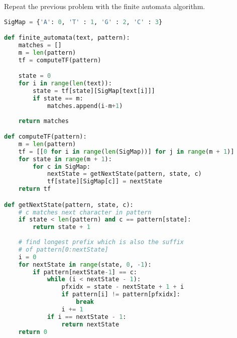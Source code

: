 \documentclass[12pt]{article}
\newenvironment{problem}[2][Problem]{\begin{trivlist}
\item[\hskip \labelsep {\bfseries #1}\hskip \labelsep {\bfseries #2.}]}{\end{trivlist}}
\begin{document}
\pagebreak
\begin{problem}{3} %
    Repeat the previous problem with the finite automata algorithm.
\begin{lstlisting}[language=Python, caption=finite automata algorithm]
SigMap = {'A': 0, 'T' : 1, 'G' : 2, 'C' : 3}

def finite_automata(text, pattern):
    matches = []
    m = len(pattern)
    tf = computeTF(pattern)

    state = 0
    for i in range(len(text)):
        state = tf[state][SigMap[text[i]]]
        if state == m:
            matches.append(i-m+1)
    
    return matches

def computeTF(pattern):
    m = len(pattern)
    tf = [[0 for i in range(len(SigMap))] for j in range(m + 1)]
    for state in range(m + 1):
        for c in SigMap:
            nextState = getNextState(pattern, state, c)
            tf[state][SigMap[c]] = nextState
    return tf

def getNextState(pattern, state, c):
    # c matches next character in pattern
    if state < len(pattern) and c == pattern[state]:
        return state + 1
    
    # find longest prefix which is also the suffix
    # of pattern[0:nextState]
    i = 0
    for nextState in range(state, 0, -1):
        if pattern[nextState-1] == c:
            while (i < nextState - 1):
                pfxidx = state - nextState + 1 + i
                if pattern[i] != pattern[pfxidx]:
                    break
                i += 1
            if i == nextState - 1:
                return nextState
    return 0
\end{lstlisting}
\pagebreak


\end{problem}
\end{document}
